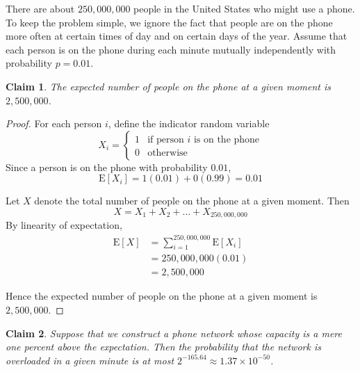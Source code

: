\documentclass{article}
\newtheorem{claim}{Claim}
\begin{document}
There are about $250{,}000{,}000$ people in the United States who might use a phone. To keep the problem 
simple, we ignore the fact that people are on the phone more often at certain times of day and on certain 
days of the year. Assume that each person is on the phone during each minute mutually independently with 
probability $p = 0.01$.

\begin{claim}
    The expected number of people on the phone at a given moment is $2{,}500{,}000$.
\end{claim}

\begin{proof}
    For each person $i$, define the indicator random variable
    \[
    X_i =
    \begin{cases}
    1 & \text{if person } i \text{ is on the phone} \\
    0 & \text{otherwise}
    \end{cases}
    \]
    Since a person is on the phone with probability $0.01$,
    \[
    \mathrm{E}[X_i] = 1(0.01) + 0(0.99) = 0.01
    \]

    \medskip

    Let $X$ denote the total number of people on the phone at a given moment. Then
    \[
    X = X_1 + X_2 + \dots + X_{250{,}000{,}000}
    \]
    By linearity of expectation,
    \[
    \begin{aligned}
    \mathrm{E}[X] &= \sum_{i=1}^{250{,}000{,}000}\mathrm{E}[X_i] \\ 
    &= 250{,}000{,}000(0.01) \\
    &= 2{,}500{,}000
    \end{aligned}
    \]

    \medskip

    Hence the expected number of people on the phone at a given moment is $2{,}500{,}000$.
\end{proof}

\begin{claim}
    Suppose that we construct a phone network whose capacity is a mere one percent above the expectation.
    Then the probability that the network is overloaded in a given minute is at most 
    $2^{-165.64} \approx 1.37 \times 10^{-50}$. %
\end{claim}
\end{document}
